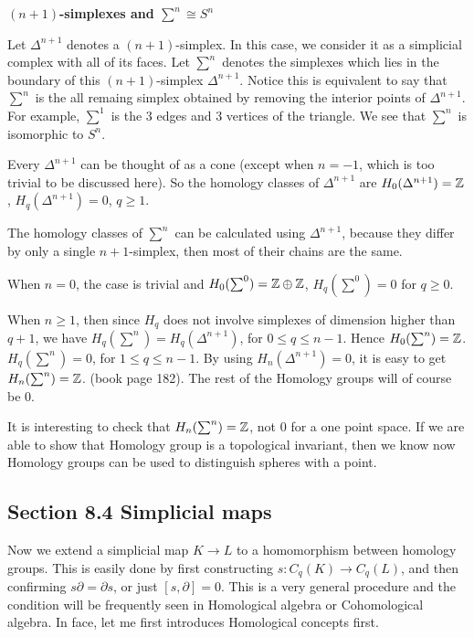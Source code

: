 \begin{ex}\textbf{$(n+1)$-simplexes and $\sum^n\cong S^n$}

    Let $\Delta^{n+1}$ denotes a $(n+1)$-simplex. In this case, we
    consider it as a simplicial complex with all of its faces. Let
    $\sum^n$ denotes the simplexes which lies in the boundary of this
    $(n+1)$-simplex $\Delta^{n+1}$. Notice this is equivalent to say
    that $\sum^n$ is the all remaing simplex obtained by removing the
    interior points of $\Delta^{n+1}$. For example, $\sum^1$ is the
    3 edges and 3 vertices of the triangle. We see that $\sum^n$ is
    isomorphic to $S^n$.

    Every $\Delta^{n+1}$ can be thought of as a cone (except when
    $n=-1$, which is too trivial to be discussed here). So the
    homology classes of $\Delta^{n+1}$ are $H_0(\Delta^{n+1})=\mathbb{Z}$,
    $H_q(\Delta^{n+1})=0$, $q\geq 1$.
    
    The homology classes of $\sum^n$ can be calculated using
    $\Delta^{n+1}$, because they differ by only a single
    ${n+1}$-simplex, then most of their chains are the same.

    When $n=0$, the case is trivial and $H_0(\sum^0)=\mathbb{Z}\oplus\mathbb{Z}$,
    $H_q(\sum^0)=0$ for $q\geq 0$.

    When $n\geq 1$, then since $H_q$ does not involve simplexes of
    dimension higher than $q+1$, we have
    $H_q(\sum^n)=H_q(\Delta^{n+1})$, for $0\leq q\leq n-1$. Hence
    $H_0(\sum^n)=\mathbb{Z}$. $H_q(\sum^n)=0$, for $1\leq q \leq n-1$. 
    By using $H_n(\Delta^{n+1})=0$, it is easy to get
    $H_n(\sum^n)=\mathbb{Z}$. (book\cite{book} page 182). The rest of the Homology groups
    will of course be $0$.

    It is interesting to check that $H_n(\sum^n)=\mathbb{Z}$, not $0$ for a
    one point space. If we are able to show that Homology group is a
    topological invariant, then we know now Homology groups can be
    used to distinguish spheres with a point.
\end{ex}


\subsection{Section 8.4 Simplicial maps}
\label{sec:Simplicial maps}

Now we extend a simplicial map $K\to L$ to a homomorphism between
homology groups. This is easily done by first constructing
$s:C_q(K)\to C_q(L)$, and then confirming $s\partial=\partial s$, or
just $[s,\partial]=0$. This is a very general procedure and the
condition will be frequently seen in Homological algebra or
Cohomological algebra. In face, let me first introduces Homological
concepts first.

